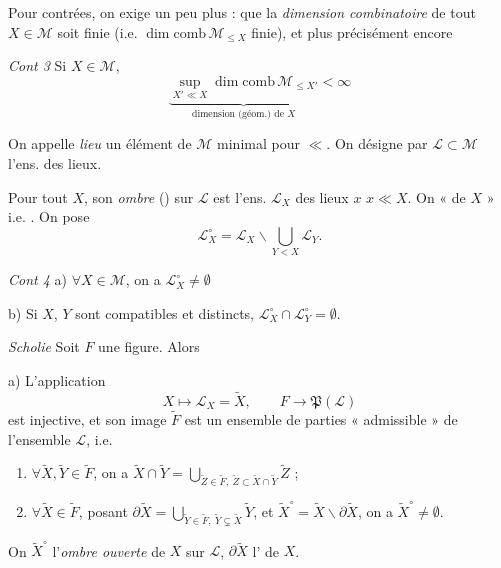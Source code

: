 \documentclass[11pt,a4paper]{article}
\begin{document}
Pour contrées, on exige un peu plus : que la \emph{dimension combinatoire} de tout $X \in \mathcal{M}$ soit finie (i.e. $\dim \mathrm{comb}\, \mathcal{M}_{\leq X}$ finie), et plus précisément encore

\emph{Cont 3} \quad Si $X \in \mathcal{M}$,
\[
  \underbrace{\sup_{X' \ll X} \dim \mathrm{comb}\, \mathcal{M}_{\leq X'}}_{\text{dimension (géom.) de } X} < \infty
\]

On appelle \emph{lieu} un élément de $\mathcal{M}$ minimal pour $\ll$. On désigne par $\mathcal{L} \subset \mathcal{M}$ l'ens. des lieux.

Pour tout $X$, son \emph{ombre} () sur $\mathcal{L}$ est l'ens. $\mathcal{L}_X$ des lieux $x$ \struck{\ill{}} $x \ll X$. On \ill{} « \ill{} de $X$ » i.e. \ill{} \ill{}. On pose
\[
  \mathcal{L}^{\circ}_X = \mathcal{L}_X \smallsetminus \bigcup_{Y < X} \mathcal{L}_Y .
\]

\emph{Cont 4} \quad a) $\forall X \in \mathcal{M}$, on a $\mathcal{L}^{\circ}_X \neq \emptyset$

b) Si $X$, $Y$ sont compatibles et distincts, $\mathcal{L}^{\circ}_X \cap \mathcal{L}^{\circ}_Y = \emptyset$.

\emph{Scholie}  Soit $F$ une figure. Alors

a) L'application
\[
  X \longmapsto \mathcal{L}_X = \widetilde{X}, \qquad F \longrightarrow \mathfrak{P}(\mathcal{L})
\]
est injective, et son image $\widetilde{F}$ est un ensemble de parties « admissible » de l'ensemble $\mathcal{L}$, i.e.
\begin{enumerate}
  \item[a)] $\forall \widetilde{X}, \widetilde{Y} \in \widetilde{F}$, on a $\widetilde{X} \cap \widetilde{Y} = \bigcup_{\widetilde{Z} \in \widetilde{F},\ \widetilde{Z} \subset \widetilde{X} \cap \widetilde{Y}} \widetilde{Z}$ ;
  \item[b)] $\forall \widetilde{X} \in \widetilde{F}$, posant $\partial \widetilde{X} = \bigcup_{\widetilde{Y} \in \widetilde{F},\ \widetilde{Y} \subsetneq \widetilde{X}} \widetilde{Y}$, et $\widetilde{X}^{\circ} = \widetilde{X} \smallsetminus \partial \widetilde{X}$, on a $\widetilde{X}^{\circ} \neq \emptyset$.
\end{enumerate}
On  \ill{} $\widetilde{X}^{\circ}$ l'\emph{ombre ouverte} de $X$ sur $\mathcal{L}$, $\partial \widetilde{X}$ l'  de $X$.
\end{document}
